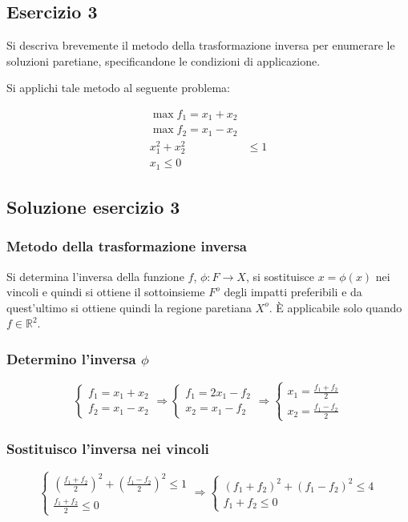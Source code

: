 \documentclass[\main/main.tex]{subfiles}
\begin{document}
\subsection{Esercizio 3}
Si descriva brevemente il metodo della trasformazione inversa per enumerare le soluzioni paretiane, specificandone le condizioni di applicazione.

Si applichi tale metodo al seguente problema:

\begin{align*}
	\max f_1  = x_1 + x_2  \\
	\max f_2  = x_1 - x_2  \\
	x_1^2 + x_2^2 & \leq 1 \\
	x_1 \leq 0
\end{align*}

\subsection{Soluzione esercizio 3}

\subsubsection*{Metodo della trasformazione inversa}
Si determina l'inversa della funzione $f$, $\phi: F \rightarrow X$, si sostituisce $x = \phi(x)$ nei vincoli e quindi si ottiene il sottoinsieme $F^o$ degli impatti preferibili e da quest'ultimo si ottiene quindi la regione paretiana $X^o$. È applicabile solo quando $f \in \mathbb{R}^2$.

\subsubsection*{Determino l'inversa $\phi$}
\[
	\begin{cases}
		f_1  = x_1 + x_2 \\
		f_2  = x_1 - x_2
	\end{cases}
	\Rightarrow
	\begin{cases}
		f_1  = 2x_1 - f_2 \\
		x_2  = x_1 - f_2
	\end{cases}
	\Rightarrow
	\begin{cases}
		x_1  = \frac{f_1 + f_2}{2} \\
		x_2  = \frac{f_1 - f_2}{2}
	\end{cases}
\]

\subsubsection*{Sostituisco l'inversa nei vincoli}
\[
	\begin{cases}
		\left( \frac{f_1 + f_2}{2} \right)^2 + \left(\frac{f_1 - f_2}{2}\right)^2 \leq 1 \\
		\frac{f_1 + f_2}{2} \leq 0
	\end{cases}
	\Rightarrow
	\begin{cases}
		\left( f_1 + f_2 \right)^2 + \left(f_1 - f_2\right)^2 \leq 4 \\
		f_1 + f_2 \leq 0
	\end{cases}
\]
\end{document}
